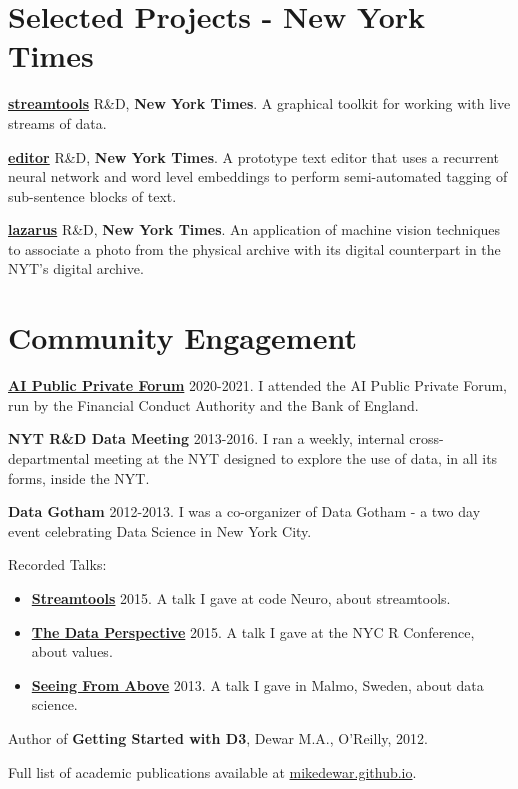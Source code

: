 \documentclass[line, overlapped]{res}
\providecommand{\tightlist}{%
  \setlength{\itemsep}{0pt}\setlength{\parskip}{0pt}}
\begin{document}
\begin{resume}
\section{Selected Projects - New York Times}
	\href{https://github.com/nytlabs/streamtools}{\textbf{streamtools}} R\&D, \textbf{New York Times}. A graphical toolkit for working with live streams of data.

	\href{http://nytlabs.com/projects/editor.html}{\textbf{editor}} R\&D, \textbf{New York Times}. A prototype text editor that uses a recurrent neural network and word level embeddings to perform semi-automated tagging of sub-sentence blocks of text.

	\href{http://nytlabs.com/projects/lazarus.html}{\textbf{lazarus}} R\&D, \textbf{New York Times}. An application of machine vision techniques to associate a photo from the physical archive with its digital counterpart in the NYT's digital archive.

\section{Community Engagement}

	\href{https://www.bankofengland.co.uk/research/fintech/ai-public-private-forum}{\textbf{AI Public Private Forum}} 2020-2021. I attended the AI Public
  Private Forum, run by the Financial Conduct Authority and the Bank of
  England.

  \textbf{NYT R\&D Data Meeting} 2013-2016. I ran a weekly, internal
  cross-departmental meeting at the NYT designed to explore the use of
  data, in all its forms, inside the NYT.

  \textbf{Data Gotham} 2012-2013. I was a co-organizer of Data Gotham -
  a two day event celebrating Data Science in New York City.

  Recorded Talks:
  \begin{itemize}
  \tightlist
	  \item \href{https://www.youtube.com/watch?v=23FgdEHOt0w}{\textbf{Streamtools}} 2015. A talk  I gave at code Neuro, about streamtools.

	  \item \href{https://www.youtube.com/watch?v=Jsg4R9z\_Z7M}{\textbf{The Data Perspective}} 2015. A talk I gave at the NYC R Conference, about values.

	  \item \href{http://videos.theconference.se/mike-dewar-big-data-understand-and}{\textbf{Seeing From Above}} 2013. A talk I gave in Malmo, Sweden, about data science.

  \end{itemize}

  Author of \textbf{Getting Started with D3}, Dewar M.A., O'Reilly,
  2012.

  Full list of academic publications available at \href{https://mikedewar.github.io}{mikedewar.github.io}.

\end{resume}
\end{document}
